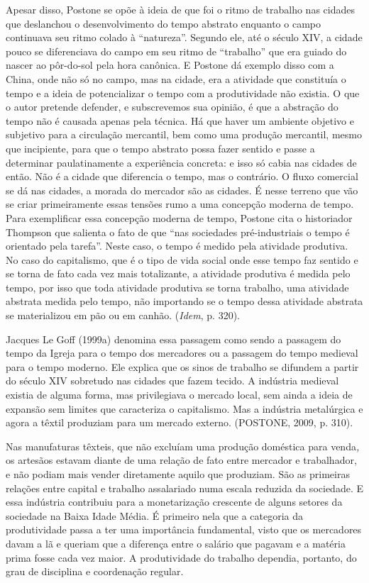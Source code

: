 Apesar disso, Postone se opõe à ideia de que foi o ritmo de trabalho nas
cidades que deslanchou o desenvolvimento do tempo abstrato enquanto o
campo continuava seu ritmo colado à ``natureza''. Segundo ele, até o
século XIV, a cidade pouco se diferenciava do campo em seu ritmo de
``trabalho'' que era guiado do nascer ao pôr-do-sol pela hora canônica.
E Postone dá exemplo disso com a China, onde não só no campo, mas na
cidade, era a atividade que constituía o tempo e a ideia de
potencializar o tempo com a produtividade não existia. O que o autor
pretende defender, e subscrevemos sua opinião, é que a abstração do
tempo não é causada apenas pela técnica. Há que haver um ambiente
objetivo e subjetivo para a circulação mercantil, bem como uma produção
mercantil, mesmo que incipiente, para que o tempo abstrato possa fazer
sentido e passe a determinar paulatinamente a experiência concreta: e
isso só cabia nas cidades de então. Não é a cidade que diferencia o
tempo, mas o contrário. O fluxo comercial se dá nas cidades, a morada do
mercador são as cidades. É nesse terreno que vão se criar primeiramente
essas tensões rumo a uma concepção moderna de tempo. Para exemplificar
essa concepção moderna de tempo, Postone cita o historiador Thompson que
salienta o fato de que ``nas sociedades pré-industriais o tempo é
orientado pela tarefa''. Neste caso, o tempo é medido pela atividade
produtiva. No caso do capitalismo, que é o tipo de vida social onde esse
tempo faz sentido e se torna de fato cada vez mais totalizante, a
atividade produtiva é medida pelo tempo, por isso que toda atividade
produtiva se torna trabalho, uma atividade abstrata medida pelo tempo,
não importando se o tempo dessa atividade abstrata se materializou em
pão ou em canhão. (\emph{Idem}, p. 320).

Jacques Le Goff (1999a) denomina essa passagem como sendo a passagem do
tempo da Igreja para o tempo dos mercadores ou a passagem do tempo
medieval para o tempo moderno. Ele explica que os sinos de trabalho se
difundem a partir do século XIV sobretudo nas cidades que fazem tecido.
A indústria medieval existia de alguma forma, mas privilegiava o mercado
local, sem ainda a ideia de expansão sem limites que caracteriza o
capitalismo. Mas a indústria metalúrgica e agora a têxtil produziam para
um mercado externo. (POSTONE, 2009, p. 310).

Nas manufaturas têxteis, que não excluíam uma produção doméstica para
venda\emph{,} os artesãos estavam diante de uma relação de fato entre
mercador e trabalhador, e não podiam mais vender diretamente aquilo que
produziam. São as primeiras relações entre capital e trabalho
assalariado numa escala reduzida da sociedade. E essa indústria
contribuiu para a monetarização crescente de alguns setores da sociedade
na Baixa Idade Média. É primeiro nela que a categoria da produtividade
passa a ter uma importância fundamental, visto que os mercadores davam a
lã e queriam que a diferença entre o salário que pagavam e a matéria
prima fosse cada vez maior. A produtividade do trabalho dependia,
portanto, do grau de disciplina e coordenação regular.

